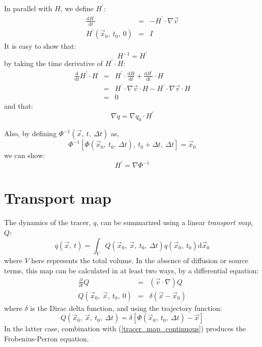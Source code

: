 \documentclass[11pt]{article}
\begin{document}
In parallel with $H$, we define $H^\prime$:
\begin{eqnarray}
\frac{\mathrm d H^\prime}{\mathrm d t} & = & -H^\prime \cdot \nabla \vec v\\
\label{inverse_deformation_matrix}
H^\prime(\vec x_0,~t_0,~0) & = & I
\end{eqnarray}
It is easy to show that:
\begin{equation}
H^{-1}=H^\prime
\end{equation}
by taking the time derivative of $H^\prime \cdot H$:
\begin{eqnarray}
\frac{\mathrm d}{\mathrm d t} H^\prime \cdot H & = & 
		H^\prime \cdot \frac{\mathrm d H}{\mathrm d t} +
		\frac{\mathrm d H^\prime}{\mathrm d t} \cdot H\\
		& = & H^\prime \cdot \nabla \vec v \cdot H 
		- H^\prime \cdot \nabla \vec v \cdot H \\
		& = & 0
\end{eqnarray}
and that:
\begin{equation}
\nabla q = \nabla q_0 \cdot H^\prime
\end{equation}

Also, by defining $\Phi^{-1}(\vec x,~t,~\Delta t)$ as,
\begin{equation}
\Phi^{-1}[\Phi(\vec x_0,~t_0,~\Delta t),~t_0+\Delta t,~\Delta t]=\vec x_0
\end{equation}
we can show:
\begin{equation}
H^\prime=\nabla \Phi^{-1}
\end{equation}

\section{Transport map}

\label{map_section}

The dynamics of the tracer, $q$, can be summarized using a linear
{\it transport map}, $Q$:
\begin{equation}
	q(\vec x,~t)=\int_{V} Q(\vec x_0,~\vec x,~t_0,~\Delta t) q(\vec x_0,~t_0) \mathrm d \vec x_0
\label{tracer_map_continuous}
\end{equation}
where $V$ here represents the total volume.
In the absence of diffusion or source terms, this map can be calculated in
at least two ways, by a differential equation: 
\begin{eqnarray}
	\frac{\partial}{\partial t} Q & = & (\vec v \cdot \nabla) Q 
\label{tracer_map_continuous1}\\
Q(\vec x_0,~\vec x,~t_0,~0) & = & \delta(\vec x-\vec x_0) 
\label{tracer_map_continuous2}
\end{eqnarray}
where $\delta$ is the Dirac delta function, and using the trajectory function:
\begin{equation}
Q(\vec x_0,~\vec x,~t_0,~\Delta t) = \delta[\Phi(\vec x_0,~t_0,~\Delta t)-\vec x]
\label{tracer_map_continuous3}
\end{equation}
In the latter case, combination with (\ref{tracer_map_continuous}) produces the
Frobenius-Perron equation. \citep{Ott1993}
\end{document}
